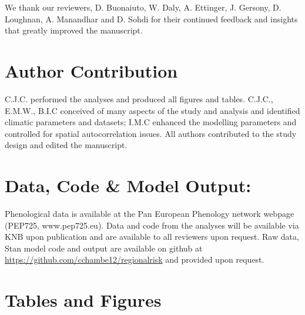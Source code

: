 \documentclass{article}\usepackage[]{graphicx}\usepackage[]{color}
\newcommand{\R}[1]{\label{#1}\linelabel{#1}}
\begin{document}
We thank our reviewers, D. Buonaiuto, W. Daly, A. Ettinger, J. Gersony, D. Loughnan, A. Manandhar and D. Sohdi for their continued feedback and insights that greatly improved the manuscript.

\section*{Author Contribution}
C.J.C. performed the analyses and produced all figures and tables. C.J.C., E.M.W., B.I.C conceived of many aspects of the study and analysis and identified climatic parameters and datasets; I.M.C enhanced the modelling parameters and controlled for spatial autocorrelation issues. All authors contributed to the study design and edited the manuscript.

\section*{Data, Code \& Model Output:}
\R{R2data}Phenological data is available at the Pan European Phenology network webpage (PEP725, www.pep725.eu). Data and code from the analyses will be available via KNB upon publication and are available to all reviewers upon request. Raw data, {Stan} model code and output are available on github at \url{https://github.com/cchambe12/regionalrisk} and provided upon request\R{R2dataend}.



\section*{Tables and Figures} 
\end{document}
